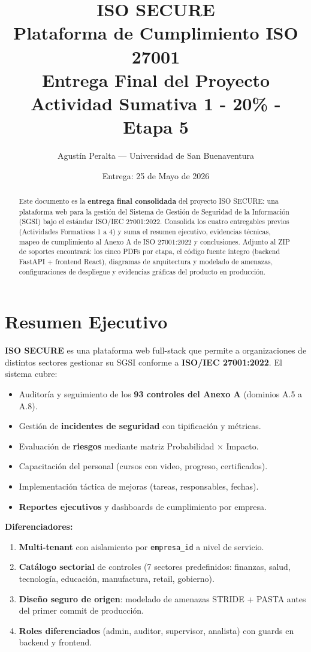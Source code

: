 \documentclass[12pt,a4paper,oneside]{article}
\title{
  {\Huge \textbf{ISO SECURE}}\\
  {\LARGE Plataforma de Cumplimiento ISO 27001}\\[2ex]
  {\Large \textcolor{accent}{Entrega Final del Proyecto}}\\[1ex]
  {\small Actividad Sumativa 1 - 20\% - Etapa 5}
}
\author{Agustín Peralta --- Universidad de San Buenaventura}
\date{Entrega: 25 de Mayo de 2026}
\begin{document}
\maketitle

\begin{abstract}
Este documento es la \textbf{entrega final consolidada} del proyecto ISO SECURE: una plataforma web para la gestión del Sistema de Gestión de Seguridad de la Información (SGSI) bajo el estándar ISO/IEC 27001:2022. Consolida los cuatro entregables previos (Actividades Formativas 1 a 4) y suma el resumen ejecutivo, evidencias técnicas, mapeo de cumplimiento al Anexo A de ISO 27001:2022 y conclusiones. Adjunto al ZIP de soportes encontrará: los cinco PDFs por etapa, el código fuente íntegro (backend FastAPI + frontend React), diagramas de arquitectura y modelado de amenazas, configuraciones de despliegue y evidencias gráficas del producto en producción.
\end{abstract}

\tableofcontents
\newpage

\section{Resumen Ejecutivo}

\textbf{ISO SECURE} es una plataforma web full-stack que permite a organizaciones de distintos sectores gestionar su SGSI conforme a \textbf{ISO/IEC 27001:2022}. El sistema cubre:

\begin{itemize}[leftmargin=*]
  \item Auditoría y seguimiento de los \textbf{93 controles del Anexo A} (dominios A.5 a A.8).
  \item Gestión de \textbf{incidentes de seguridad} con tipificación y métricas.
  \item Evaluación de \textbf{riesgos} mediante matriz Probabilidad × Impacto.
  \item Capacitación del personal (cursos con video, progreso, certificados).
  \item Implementación táctica de mejoras (tareas, responsables, fechas).
  \item \textbf{Reportes ejecutivos} y dashboards de cumplimiento por empresa.
\end{itemize}

\textbf{Diferenciadores:}

\begin{enumerate}[leftmargin=*]
  \item \textbf{Multi-tenant} con aislamiento por \texttt{empresa\_id} a nivel de servicio.
  \item \textbf{Catálogo sectorial} de controles (7 sectores predefinidos: finanzas, salud, tecnología, educación, manufactura, retail, gobierno).
  \item \textbf{Diseño seguro de origen}: modelado de amenazas STRIDE + PASTA antes del primer commit de producción.
  \item \textbf{Roles diferenciados} (admin, auditor, supervisor, analista) con guards en backend y frontend.
\end{enumerate}
\end{document}
